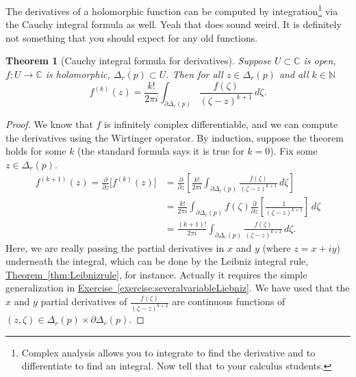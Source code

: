 \documentclass[12pt,openany]{book}
\newcommand{\C}{{\mathbb{C}}}
\newcommand{\N}{{\mathbb{N}}}
\theoremstyle{plain}
\newtheorem{thm}{Theorem}[section]
\theoremstyle{remark}
\theoremstyle{definition}
\theoremstyle{exercise}
\theoremstyle{example}
\newcommand{\exerciseref}[1]{\hyperref[#1]{Exercise~\ref*{#1}}}
\newcommand{\thmref}[1]{\hyperref[#1]{Theorem~\ref*{#1}}}
\begin{document}
The derivatives of a holomorphic function can be computed by
integration\footnote{Complex analysis allows you to integrate to find the
derivative and to differentiate to find an integral.  Now tell that to your
calculus students.} via the Cauchy integral formula as well.  Yeah that does sound
weird.  It is definitely not something that you should expect for any old
functions.

\begin{thm}[Cauchy integral formula for derivatives]
Suppose $U \subset \C$ is open, $f \colon U \to \C$ is holomorphic,
$\overline{\Delta_r(p)} \subset U$.
Then for all $z \in \Delta_r(p)$ and all $k \in \N$
\begin{equation*}
f^{(k)}(z)
=
\frac{k!}{2\pi i}
\int_{\partial \Delta_r(p)}
\frac{f(\zeta)}{(\zeta-z)^{k+1}}
\,
d \zeta .
\end{equation*}
\end{thm}

\begin{proof}
We know that $f$ is infinitely complex differentiable, and we can compute
the derivatives using the Wirtinger operator.
By induction, suppose the theorem holds for some $k$
(the standard formula says it is true for $k=0$).  Fix some $z \in
\Delta_r(p)$.
\begin{equation*}
\begin{split}
f^{(k+1)}(z)
=
\frac{\partial }{\partial z}
\bigl[ f^{(k)}(z) \bigr]
& =
\frac{\partial }{\partial z}
\left[
\frac{k!}{2\pi i}
\int_{\partial \Delta_r(p)}
\frac{f(\zeta)}{(\zeta-z)^{k+1}}
\,
d \zeta
\right]
\\
& = 
\frac{k!}{2\pi i}
\int_{\partial \Delta_r(p)}
f(\zeta)
\frac{\partial }{\partial z}
\left[
\frac{1}{(\zeta-z)^{k+1}}
\right]
\,
d \zeta
\\
& = 
\frac{(k+1)!}{2\pi i}
\int_{\partial \Delta_r(p)}
\frac{f(\zeta)}{(\zeta-z)^{k+2}}
\,
d \zeta .
\end{split}
\end{equation*}
Here, we are really passing the partial derivatives in $x$ and $y$ (where $z=x+iy$)
underneath the integral,
which can be done by 
the Leibniz integral rule, \thmref{thm:Leibnizrule}, for instance.
Actually it requires the simple generalization in
\exerciseref{exercise:severalvariableLiebniz}.
We have used that the
$x$ and $y$ partial derivatives of 
$\frac{f(\zeta)}{(\zeta-z)^{k+2}}$ are continuous
functions of $(z,\zeta) \in \Delta_r(p) \times \partial \Delta_r(p)$.
\end{proof}
\end{document}

